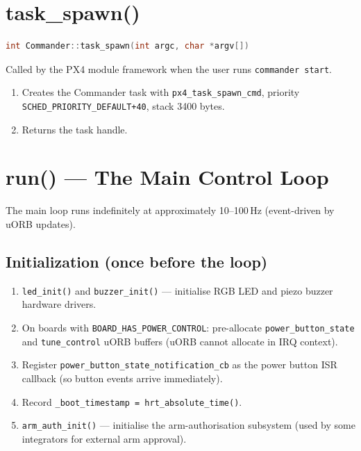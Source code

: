 \documentclass[12pt,a4paper]{article}
\begin{document}
\section{task\_spawn()}

\begin{lstlisting}[language=C++]
int Commander::task_spawn(int argc, char *argv[])
\end{lstlisting}

Called by the PX4 module framework when the user runs \texttt{commander start}.
\begin{enumerate}
  \item Creates the Commander task with \texttt{px4\_task\_spawn\_cmd}, priority
        \texttt{SCHED\_PRIORITY\_DEFAULT+40}, stack 3400 bytes.
  \item Returns the task handle.
\end{enumerate}

\section{run() --- The Main Control Loop}

The main loop runs indefinitely at approximately 10--100\,Hz (event-driven
by uORB updates).

\subsection{Initialization (once before the loop)}

\begin{enumerate}
  \item \texttt{led\_init()} and \texttt{buzzer\_init()} --- initialise
        RGB LED and piezo buzzer hardware drivers.
  \item On boards with \texttt{BOARD\_HAS\_POWER\_CONTROL}: pre-allocate
        \texttt{power\_button\_state} and \texttt{tune\_control} uORB buffers
        (uORB cannot allocate in IRQ context).
  \item Register \texttt{power\_button\_state\_notification\_cb} as the power
        button ISR callback (so button events arrive immediately).
  \item Record \texttt{\_boot\_timestamp = hrt\_absolute\_time()}.
  \item \texttt{arm\_auth\_init()} --- initialise the arm-authorisation
        subsystem (used by some integrators for external arm approval).
\end{enumerate}
\end{document}

